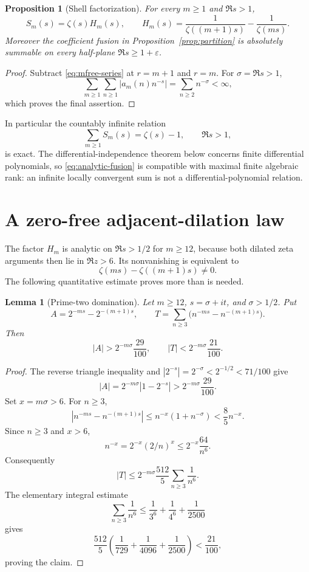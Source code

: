 \documentclass[11pt]{article}
\newtheorem{proposition}[theorem]{Proposition}
\newtheorem{lemma}[theorem]{Lemma}
\theoremstyle{definition}
\theoremstyle{remark}
\begin{document}
\begin{proposition}[Shell factorization]\label{prop:factor}
For every \(m\geq1\) and \(\Re s>1\),
\begin{equation}\label{eq:factor}
 S_m(s)=\zeta(s)H_m(s),\qquad
 H_m(s)=\frac1{\zeta((m+1)s)}-\frac1{\zeta(ms)}.
 \tag{2.5}
\end{equation}
Moreover the coefficient fusion in Proposition~\ref{prop:partition} is absolutely summable on
every half-plane \(\Re s\geq1+\varepsilon\).
\end{proposition}

\begin{proof}
Subtract \eqref{eq:mfree-series} at \(r=m+1\) and \(r=m\).  For
\(\sigma=\Re s>1\),
\[
 \sum_{m\geq1}\sum_{n\geq1}|a_m(n)n^{-s}|
 =\sum_{n\geq2}n^{-\sigma}<\infty,
\]
which proves the final assertion.
\end{proof}

In particular the countably infinite relation
\[
 \sum_{m\geq1}S_m(s)=\zeta(s)-1,\qquad \Re s>1,
 \label{eq:analytic-fusion}
 \tag{2.6}
\]
is exact.  The differential-independence theorem below concerns finite differential
polynomials, so \eqref{eq:analytic-fusion} is compatible with maximal finite algebraic rank:
an infinite locally convergent sum is not a differential-polynomial relation.

\section{A zero-free adjacent-dilation law}\label{sec:zerofree}

The factor \(H_m\) is analytic on \(\Re s>1/2\) for \(m\geq12\), because both dilated zeta
arguments then lie in \(\Re z>6\).  Its nonvanishing is equivalent to
\[
 \zeta(ms)-\zeta((m+1)s)\ne0.
\]
The following quantitative estimate proves more than is needed.

\begin{lemma}[Prime-two domination]\label{lem:two-dominates}
Let \(m\geq12\), \(s=\sigma+it\), and \(\sigma>1/2\).  Put
\[
 A=2^{-ms}-2^{-(m+1)s},
\qquad
 T=\sum_{n\geq3}\bigl(n^{-ms}-n^{-(m+1)s}\bigr).
\]
Then
\[
 |A|>2^{-m\sigma}\frac{29}{100},
 \qquad
 |T|<2^{-m\sigma}\frac{21}{100}.
 \tag{3.1}
\]
\end{lemma}

\begin{proof}
The reverse triangle inequality and \(|2^{-s}|=2^{-\sigma}<2^{-1/2}<71/100\) give
\[
 |A|=2^{-m\sigma}|1-2^{-s}|
 >2^{-m\sigma}\frac{29}{100}.
\]
Set \(x=m\sigma>6\).  For \(n\geq3\),
\[
 |n^{-ms}-n^{-(m+1)s}|
 \leq n^{-x}(1+n^{-\sigma})
 <\frac85 n^{-x}.
\]
Since \(n\geq3\) and \(x>6\),
\[
 n^{-x}=2^{-x}(2/n)^x
 \leq2^{-x}\frac{64}{n^6}.
\]
Consequently
\[
 |T|
 \leq2^{-m\sigma}\frac{512}{5}\sum_{n\geq3}\frac1{n^6}.
\]
The elementary integral estimate
\[
 \sum_{n\geq3}\frac1{n^6}
 \leq\frac1{3^6}+\frac1{4^6}+\frac1{2500}
\]
gives
\[
 \frac{512}{5}
 \left(\frac1{729}+\frac1{4096}+\frac1{2500}\right)
 <\frac{21}{100},
\]
proving the claim.
\end{proof}
\end{document}
